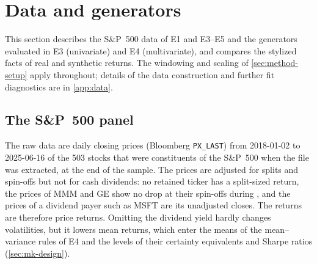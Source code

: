 \section{Data and generators}\label{sec:data}

This section describes the S\&P~500 data of E1 and E3--E5 and the generators evaluated in E3
(univariate) and E4 (multivariate), and compares the stylized facts of real and synthetic
returns. The windowing and scaling of \cref{sec:method-setup} apply throughout; details of the
data construction and further fit diagnostics are in \cref{app:data}.

\subsection{The S\texorpdfstring{\&}{and}P~500 panel}\label{sec:data-panel}

The raw data are daily closing prices (Bloomberg \texttt{PX\_LAST}) from 2018-01-02 to
2025-06-16 of the 503 stocks that were constituents of the S\&P~500 when the file was extracted,
at the end of the sample. The prices are adjusted for splits and spin-offs but not for cash
dividends: no retained ticker has a split-sized return, the prices of MMM and GE show no drop at
their spin-offs during \TEST{}, and the prices of a dividend payer such as MSFT are its unadjusted
closes. The returns are therefore price returns. Omitting the dividend yield hardly changes
volatilities, but it lowers mean returns, which enter the \TRAIN{} means of the mean--variance
rules of E4 and the levels of their certainty equivalents and Sharpe ratios
(\cref{sec:mk-design}).

